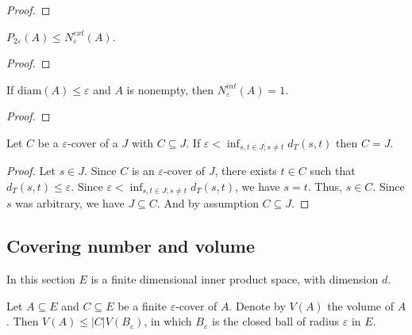 \begin{proof}\leanok

\end{proof}


\begin{lemma}\label{lem:packingNumber_two_le_externalCoveringNumber}
  \leanok
$P_{2\varepsilon}(A) \le N^{ext}_\varepsilon(A)$.
\end{lemma}

\begin{proof}\leanok

\end{proof}


\begin{lemma}\label{lem:internalCoveringNumber_eq_one_of_diam_le}
  \leanok
If $\mathrm{diam}(A) \le \varepsilon$ and $A$ is nonempty, then $N^{int}_\varepsilon(A) = 1$.
\end{lemma}

\begin{proof}\leanok

\end{proof}


\begin{lemma}\label{lem:cover_eq_of_lt_iInf_dist}
  \leanok
Let $C$ be a $\varepsilon$-cover of a $J$ with $C \subseteq J$.
If $\varepsilon < \inf_{s, t \in J; s \ne t} d_T(s, t)$ then $C = J$.
\end{lemma}

\begin{proof}
Let $s \in J$. Since $C$ is an $\varepsilon$-cover of $J$, there exists $t \in C$ such that $d_T(s, t) \le \varepsilon$.
Since $\varepsilon < \inf_{s, t \in J; s \ne t}d_T(s, t)$, we have $s = t$.
Thus, $s \in C$.
Since $s$ was arbitrary, we have $J \subseteq C$.
And by assumption $C \subseteq J$.
\end{proof}


\subsection{Covering number and volume}

In this section $E$ is a finite dimensional inner product space, with dimension $d$.

\begin{lemma}\label{lem:volume_le_of_isCover}
  \leanok
Let $A \subseteq E$ and $C \subseteq E$ be a finite $\varepsilon$-cover of $A$. Denote by $V(A)$ the volume of $A$.
Then $V(A) \le \vert C \vert V(B_\varepsilon)$, in which $B_\varepsilon$ is the closed ball of radius $\varepsilon$ in $E$.
\end{lemma}


